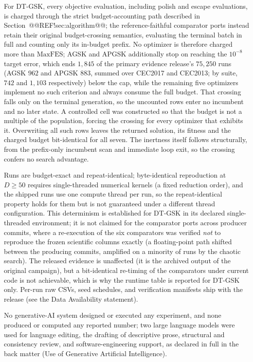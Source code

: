 \documentclass[10pt,a4paper]{article}
\newcommand{\dtgsk}{DT-GSK}
\begin{document}
For \dtgsk{}, every objective evaluation, including polish and escape
evaluations, is charged through the strict budget-accounting path
described in Section~@@REF!sec:algorithm@@; the reference-faithful
comparator ports instead retain their original budget-crossing
semantics, evaluating the terminal batch in full and counting only its
in-budget prefix. No optimizer is therefore charged more than
$\mathrm{MaxFES}$; AGSK and APGSK additionally stop on reaching the
$10^{-8}$ target error, which ends $1{,}845$ of the primary evidence
release's $75{,}250$ runs
(AGSK $962$ and APGSK $883$, summed over CEC2017 and CEC2013; by suite,
$742$ and $1{,}103$ respectively) below the cap, while
the remaining five optimizers implement no such criterion and always consume
the full budget. That crossing falls only on the terminal
generation, so the uncounted rows enter no incumbent and no later state.
A controlled cell was constructed so that the budget is not a multiple of the
population, forcing the crossing for every optimizer that exhibits it.
Overwriting all such rows leaves the returned solution, its fitness and the
charged budget bit-identical for all seven. The inertness itself follows
structurally, from the prefix-only incumbent scan and immediate loop exit, so
the crossing confers no search advantage.




Runs are budget-exact and
repeat-identical; byte-identical reproduction at $D \geq 50$ requires
single-threaded numerical kernels (a fixed reduction order), and the
shipped runs use one compute thread per run, so the repeat-identical
property holds for them but is not guaranteed under a different thread
configuration. This determinism is established for \dtgsk{} in its
declared single-threaded environment; it is not claimed for the
comparator ports across producer commits, where a re-execution of the
six comparators was verified \emph{not} to reproduce the frozen
scientific columns exactly (a floating-point path shifted between the
producing commits, amplified on a minority of runs by the chaotic
search). The released evidence is unaffected (it is the archived
output of the original campaign), but a bit-identical re-timing of the
comparators under current code is not achievable, which is why the
runtime table is reported for \dtgsk{} only. Per-run raw
CSVs, seed schedules, and verification manifests ship with the
release (see the Data Availability statement).


No generative-AI system designed or executed any experiment, and none
produced or computed any reported number; two large language models were
used for language editing, the drafting of descriptive prose, structural
and consistency review, and software-engineering support, as
declared in full in the back matter (Use of Generative Artificial
Intelligence).
\end{document}
